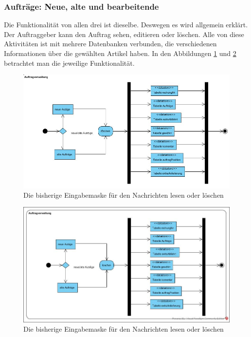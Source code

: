 \subsubsection{Aufträge: Neue, alte und bearbeitende}

Die Funktionalität von allen drei ist dieselbe. Deswegen es wird allgemein erklärt. Der Auftraggeber kann den Auftrag sehen, editieren oder löschen. Alle von diese Aktivitäten ist mit mehrere Datenbanken verbunden, die verschiedenen Informationen über die gewählten Artikel haben. In den Abbildungen \ref{fig:Autrag_Loeschen} und \ref{fig:auftragEinsehen} betrachtet man die jeweilige Funktionalität.


\begin{figure}[h]
	\centering
	\includegraphics[width=1\linewidth]{Graphics/Autrag_Loeschen.JPG}
	\caption[AutragLoeschen]{Die bisherige Eingabemaske für den Nachrichten lesen oder löschen}
	\label{fig:Autrag_Loeschen}
\end{figure}
 
\begin{figure}[h] 
	\centering
	\includegraphics[width=1\linewidth]{Graphics/auftragVerwaltung.JPG}
	\caption[auftragEinsehen]{Die bisherige Eingabemaske für den Nachrichten lesen oder löschen}
	\label{fig:auftragEinsehen}
\end{figure}

